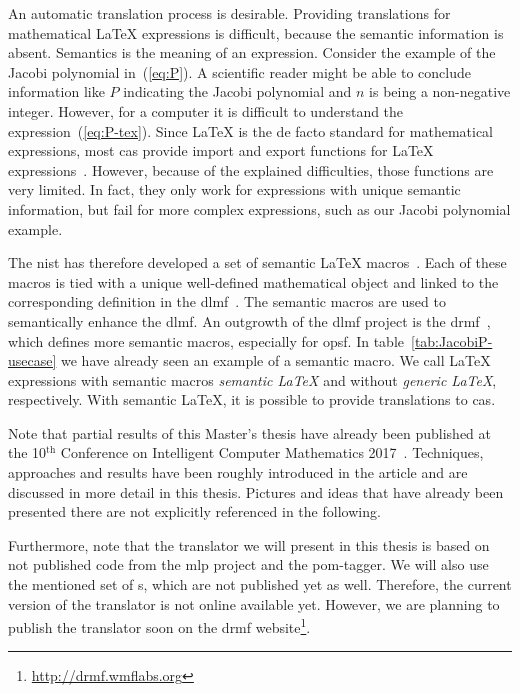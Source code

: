An automatic translation process is desirable. Providing translations for mathematical \LaTeX{} expressions is difficult, because the semantic information is absent. Semantics is the meaning of an expression. Consider the example of the Jacobi polynomial in~(\ref{eq:P}). A scientific reader might be able to conclude information like $P$ indicating the Jacobi polynomial and $n$ is being a non-negative integer. However, for a computer it is difficult to understand the expression~(\ref{eq:P-tex}). Since \LaTeX{} is the de facto standard for mathematical expressions, most \gls{cas} provide import and export functions for \LaTeX{} expressions~\cite{Maple:ImportExport,Mathematica:ImportExport,Matlab:ImportExport,Sage:ImportExport}. However, because of the explained difficulties, those functions are very limited. In fact, they only work for expressions with unique semantic information, but fail for more complex expressions, such as our Jacobi polynomial example.

The \gls{nist} has therefore developed a set of semantic \LaTeX{} macros~\cite{DLMF:Macros}. Each of these macros is tied with a unique well-defined mathematical object and linked to the corresponding definition in the \gls{dlmf}~\cite{NIST:DLMF,NIST:DLMF:Paper,NIST:Handbook}. The semantic macros are used to semantically enhance the \gls{dlmf}. An outgrowth of the \gls{dlmf} project is the \gls{drmf}~\cite{DRMF:14,DRMF:15}, which defines more semantic macros, especially for \gls{opsf}. In table~\ref{tab:JacobiP-usecase} we have already seen an example of a semantic macro. We call \LaTeX{} expressions with semantic macros \textit{semantic \LaTeX{}} and without \textit{generic \LaTeX}, respectively. With semantic \LaTeX, it is possible to provide translations to \gls{cas}.

Note that partial results of this Master's thesis have already been published at the 10$^\text{th}$ Conference on Intelligent Computer Mathematics 2017~\cite{CICM:Paper}. Techniques, approaches and results have been roughly introduced in the article and are discussed in more detail in this thesis. Pictures and ideas that have already been presented there are not explicitly referenced in the following.

Furthermore, note that the translator we will present in this thesis is based on not published code from the \gls{mlp} project and the \gls{pom}-tagger. We will also use the mentioned set of \Macro s, which are not published yet as well. Therefore, the current version of the translator is not online available yet. However, we are planning to publish the translator soon on the \gls{drmf} website\footnote{\url{http://drmf.wmflabs.org}}.

